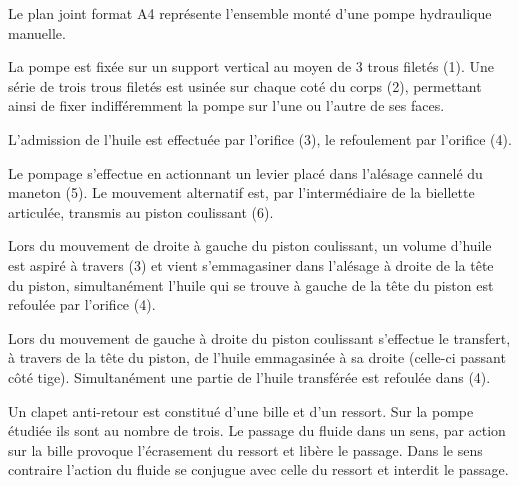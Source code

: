 \normalfalse \difficiletrue \tdifficilefalse
\correctionfalse

\setcounter{question}{0}

\ifcorrection
\else
{}
\fi



\ifprof
\else
Le plan joint format A4 représente l’ensemble monté d’une pompe hydraulique manuelle.

La pompe est fixée sur un support vertical au moyen de 3 trous filetés (1). Une série de trois trous filetés est usinée sur chaque coté du corps (2), permettant ainsi de fixer indifféremment la pompe sur l’une ou l’autre de ses faces.

L’admission de l’huile est effectuée par l’orifice (3), le refoulement par l’orifice (4).

Le pompage s’effectue en actionnant un levier placé dans l’alésage cannelé du maneton (5). Le mouvement alternatif est, par l’intermédiaire de la biellette articulée, transmis au piston coulissant (6).

Lors du mouvement de droite à gauche du piston coulissant, un volume d’huile est aspiré à travers (3) et vient s’emmagasiner dans l’alésage à droite de la tête du piston, simultanément l’huile qui se trouve à gauche de la tête du piston est refoulée par l’orifice (4).

Lors du mouvement de gauche à droite du piston coulissant s’effectue le transfert, à travers de la tête du piston, de l’huile emmagasinée à sa droite (celle-ci passant côté tige). Simultanément une partie de l’huile transférée est refoulée dans (4).

Un clapet anti-retour est constitué d’une bille et d’un ressort. Sur la pompe étudiée ils sont au nombre de trois. 
Le passage du fluide dans un sens, par action sur la bille provoque l’écrasement du ressort et libère le passage. 
Dans le sens contraire l’action du fluide se conjugue avec celle du ressort et interdit le passage. 
\fi


